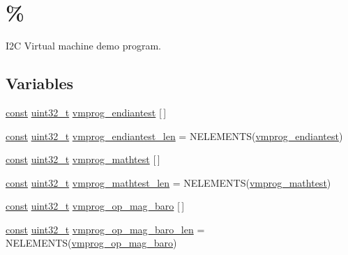 \hypertarget{group___c_l_a_s_s}{\section{\%}
\label{group___c_l_a_s_s}
}


I2\-C Virtual machine demo program.  


\subsection*{Variables}
\begin{DoxyCompactItemize}
\item 
\hyperlink{group___n_a_m_e_ga7ae6d0e43244213b34de2c2b9aa30da6}{const} \hyperlink{stdint_8h_a435d1572bf3f880d55459d9805097f62}{uint32\-\_\-t} \hyperlink{group___c_l_a_s_s_ga97db8eb6770f15d92457ae44bf607d31}{vmprog\-\_\-endiantest} \mbox{[}$\,$\mbox{]}
\item 
\hyperlink{group___n_a_m_e_ga7ae6d0e43244213b34de2c2b9aa30da6}{const} \hyperlink{stdint_8h_a435d1572bf3f880d55459d9805097f62}{uint32\-\_\-t} \hyperlink{group___c_l_a_s_s_ga3158e6c7b2a8dff094103560829aba35}{vmprog\-\_\-endiantest\-\_\-len} = N\-E\-L\-E\-M\-E\-N\-T\-S(\hyperlink{group___c_l_a_s_s_ga97db8eb6770f15d92457ae44bf607d31}{vmprog\-\_\-endiantest})
\item 
\hyperlink{group___n_a_m_e_ga7ae6d0e43244213b34de2c2b9aa30da6}{const} \hyperlink{stdint_8h_a435d1572bf3f880d55459d9805097f62}{uint32\-\_\-t} \hyperlink{group___c_l_a_s_s_ga4521deb4c490a6b3d44fc340ad4161cd}{vmprog\-\_\-mathtest} \mbox{[}$\,$\mbox{]}
\item 
\hyperlink{group___n_a_m_e_ga7ae6d0e43244213b34de2c2b9aa30da6}{const} \hyperlink{stdint_8h_a435d1572bf3f880d55459d9805097f62}{uint32\-\_\-t} \hyperlink{group___c_l_a_s_s_gad7ec24bf861eca543cf96c11f9607fcc}{vmprog\-\_\-mathtest\-\_\-len} = N\-E\-L\-E\-M\-E\-N\-T\-S(\hyperlink{group___c_l_a_s_s_ga4521deb4c490a6b3d44fc340ad4161cd}{vmprog\-\_\-mathtest})
\item 
\hyperlink{group___n_a_m_e_ga7ae6d0e43244213b34de2c2b9aa30da6}{const} \hyperlink{stdint_8h_a435d1572bf3f880d55459d9805097f62}{uint32\-\_\-t} \hyperlink{group___c_l_a_s_s_ga7f8283bd8d2bd7a50c0de34bc17e6e59}{vmprog\-\_\-op\-\_\-mag\-\_\-baro} \mbox{[}$\,$\mbox{]}
\item 
\hyperlink{group___n_a_m_e_ga7ae6d0e43244213b34de2c2b9aa30da6}{const} \hyperlink{stdint_8h_a435d1572bf3f880d55459d9805097f62}{uint32\-\_\-t} \hyperlink{group___c_l_a_s_s_gab041ee4d6bd39413440978233bbb8934}{vmprog\-\_\-op\-\_\-mag\-\_\-baro\-\_\-len} = N\-E\-L\-E\-M\-E\-N\-T\-S(\hyperlink{group___c_l_a_s_s_ga7f8283bd8d2bd7a50c0de34bc17e6e59}{vmprog\-\_\-op\-\_\-mag\-\_\-baro})
\end{DoxyCompactItemize}


